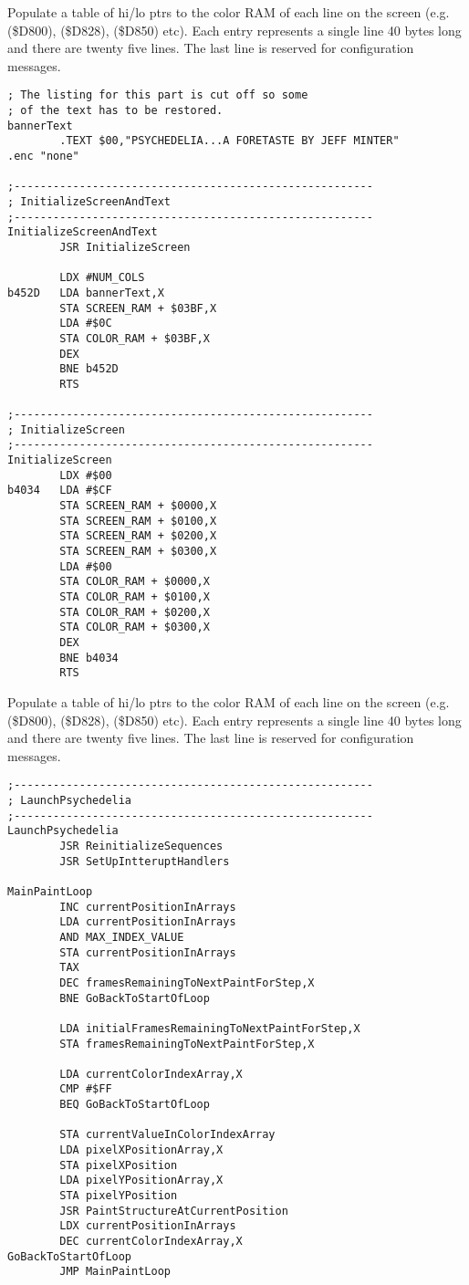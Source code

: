 Populate a table of hi/lo ptrs to the color RAM
of each line on the screen (e.g. \icode(\$D800), \icode(\$D828), \icode(\$D850) etc). Each entry represents a single
line 40 bytes long and there are twenty five lines.
The last line is reserved for configuration messages.

\clearpage
\begin{lstlisting}
; The listing for this part is cut off so some
; of the text has to be restored.
bannerText   
        .TEXT $00,"PSYCHEDELIA...A FORETASTE BY JEFF MINTER"
.enc "none"

;-------------------------------------------------------
; InitializeScreenAndText
;-------------------------------------------------------
InitializeScreenAndText   
        JSR InitializeScreen

        LDX #NUM_COLS
b452D   LDA bannerText,X
        STA SCREEN_RAM + $03BF,X
        LDA #$0C
        STA COLOR_RAM + $03BF,X
        DEX 
        BNE b452D
        RTS 

;-------------------------------------------------------
; InitializeScreen
;-------------------------------------------------------
InitializeScreen   
        LDX #$00
b4034   LDA #$CF
        STA SCREEN_RAM + $0000,X
        STA SCREEN_RAM + $0100,X
        STA SCREEN_RAM + $0200,X
        STA SCREEN_RAM + $0300,X
        LDA #$00
        STA COLOR_RAM + $0000,X
        STA COLOR_RAM + $0100,X
        STA COLOR_RAM + $0200,X
        STA COLOR_RAM + $0300,X
        DEX 
        BNE b4034
        RTS 

\end{lstlisting}
\clearpage

Populate a table of hi/lo ptrs to the color RAM
of each line on the screen (e.g. \icode(\$D800), \icode(\$D828), \icode(\$D850) etc). Each entry represents a single
line 40 bytes long and there are twenty five lines.
The last line is reserved for configuration messages.

\clearpage
\begin{lstlisting}
;-------------------------------------------------------
; LaunchPsychedelia
;-------------------------------------------------------
LaunchPsychedelia   
        JSR ReinitializeSequences
        JSR SetUpIntteruptHandlers

MainPaintLoop   
        INC currentPositionInArrays
        LDA currentPositionInArrays
        AND MAX_INDEX_VALUE
        STA currentPositionInArrays
        TAX 
        DEC framesRemainingToNextPaintForStep,X
        BNE GoBackToStartOfLoop

        LDA initialFramesRemainingToNextPaintForStep,X
        STA framesRemainingToNextPaintForStep,X

        LDA currentColorIndexArray,X
        CMP #$FF
        BEQ GoBackToStartOfLoop

        STA currentValueInColorIndexArray
        LDA pixelXPositionArray,X
        STA pixelXPosition
        LDA pixelYPositionArray,X
        STA pixelYPosition
        JSR PaintStructureAtCurrentPosition
        LDX currentPositionInArrays
        DEC currentColorIndexArray,X
GoBackToStartOfLoop   
        JMP MainPaintLoop

\end{lstlisting}
\clearpage

